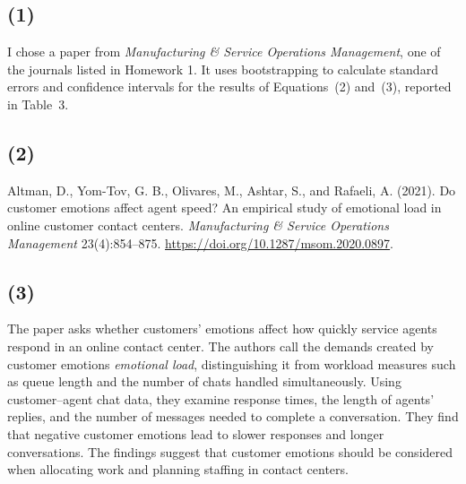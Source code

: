 \documentclass[11pt]{article}
\begin{document}
\subsection{(1)}
I chose a paper from \emph{Manufacturing \& Service Operations Management},
one of the journals listed in Homework 1. It uses bootstrapping to
calculate standard errors and confidence intervals for the results of
Equations~(2) and~(3), reported in Table~3.

\subsection{(2)}
Altman, D., Yom-Tov, G. B., Olivares, M., Ashtar, S., and Rafaeli, A.
(2021). Do customer emotions affect agent speed? An empirical study of
emotional load in online customer contact centers. \emph{Manufacturing \&
Service Operations Management} 23(4):854--875.
\url{https://doi.org/10.1287/msom.2020.0897}.

\subsection{(3)}
The paper asks whether customers' emotions affect how quickly service
agents respond in an online contact center. The authors call the demands
created by customer emotions \emph{emotional load}, distinguishing it
from workload measures such as queue length and the number of chats
handled simultaneously. Using customer--agent chat data, they examine
response times, the length of agents' replies, and the number of messages
needed to complete a conversation. They find that negative customer
emotions lead to slower responses and longer conversations. The findings
suggest that customer emotions should be considered when allocating work
and planning staffing in contact centers.
\end{document}
